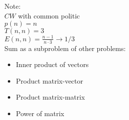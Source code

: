Note:\\
$CW$ with common politic\\
$p(n) = n$\\
$T(n, n) = 3$\\
$E(n, n) = \frac{n-1}{n \cdot 3} \rightarrow 1/3$\\
Sum as a subproblem of other problems:\\
\begin{itemize}
 \item Inner product of vectors
 \item Product matrix-vector
 \item Product matrix-matrix
 \item Power of matrix
\end{itemize}

